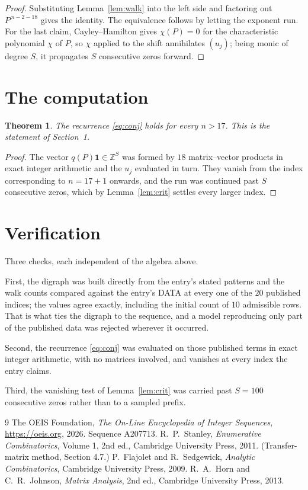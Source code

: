 \documentclass[11pt,a4paper]{article}
\theoremstyle{plain}
\newtheorem{theorem}{Theorem}
\theoremstyle{definition}
\begin{document}
\begin{proof}
Substituting Lemma~\ref{lem:walk} into the left side and factoring out
$P^{\,n-2-18}$ gives the identity. The equivalence follows by letting the exponent
run. For the last claim, Cayley--Hamilton gives $\chi(P)=0$ for the characteristic
polynomial $\chi$ of $P$, so $\chi$ applied to the shift annihilates $(u_j)$; being monic of
degree $S$, it propagates $S$ consecutive zeros forward.
\end{proof}

\section{The computation}

\begin{theorem}
The recurrence \eqref{eq:conj} holds for every $n>17$. This is the statement of
Section~1.
\end{theorem}

\begin{proof}
The vector $q(P)\mathbf{1}\in\mathbb{Z}^{S}$ was formed by $18$ matrix--vector
products in exact integer arithmetic and the $u_j$ evaluated in turn. They vanish from the
index corresponding to $n=17+1$ onwards, and the run was continued past $S$ consecutive
zeros, which by Lemma~\ref{lem:crit} settles every larger index.
\end{proof}

\section{Verification}

Three checks, each independent of the algebra above.

First, the digraph was built directly from the entry's stated patterns and the walk counts
compared against the entry's DATA at every one of the $20$ published indices; the
values agree exactly, including the initial count of $10$ admissible rows. That is
what ties the digraph to the sequence, and a model reproducing only part of the published
data was rejected wherever it occurred.

Second, the recurrence \eqref{eq:conj} was evaluated on those published terms in exact
integer arithmetic, with no matrices involved, and vanishes at every index the entry claims.

Third, the vanishing test of Lemma~\ref{lem:crit} was carried past $S=100$ consecutive
zeros rather than to a sampled prefix.

\begin{thebibliography}{9}
 The OEIS Foundation, \emph{The On-Line Encyclopedia of Integer
Sequences}, \url{https://oeis.org}, 2026. Sequence A207713.
 R.~P.~Stanley, \emph{Enumerative Combinatorics}, Volume 1, 2nd ed.,
Cambridge University Press, 2011. (Transfer-matrix method, Section 4.7.)
 P.~Flajolet and R.~Sedgewick, \emph{Analytic Combinatorics}, Cambridge
University Press, 2009.
 R.~A.~Horn and C.~R.~Johnson, \emph{Matrix Analysis}, 2nd ed., Cambridge
University Press, 2013.
\end{thebibliography}
\end{document}
